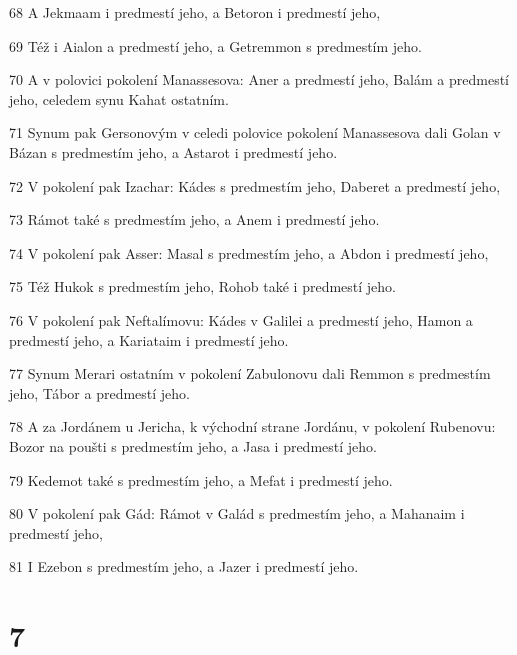 \par 68 A Jekmaam i predmestí jeho, a Betoron i predmestí jeho,
\par 69 Též i Aialon a predmestí jeho, a Getremmon s predmestím jeho.
\par 70 A v polovici pokolení Manassesova: Aner a predmestí jeho, Balám a predmestí jeho, celedem synu Kahat ostatním.
\par 71 Synum pak Gersonovým v celedi polovice pokolení Manassesova dali Golan v Bázan s predmestím jeho, a Astarot i predmestí jeho.
\par 72 V pokolení pak Izachar: Kádes s predmestím jeho, Daberet a predmestí jeho,
\par 73 Rámot také s predmestím jeho, a Anem i predmestí jeho.
\par 74 V pokolení pak Asser: Masal s predmestím jeho, a Abdon i predmestí jeho,
\par 75 Též Hukok s predmestím jeho, Rohob také i predmestí jeho.
\par 76 V pokolení pak Neftalímovu: Kádes v Galilei a predmestí jeho, Hamon a predmestí jeho, a Kariataim i predmestí jeho.
\par 77 Synum Merari ostatním v pokolení Zabulonovu dali Remmon s predmestím jeho, Tábor a predmestí jeho.
\par 78 A za Jordánem u Jericha, k východní strane Jordánu, v pokolení Rubenovu: Bozor na poušti s predmestím jeho, a Jasa i predmestí jeho.
\par 79 Kedemot také s predmestím jeho, a Mefat i predmestí jeho.
\par 80 V pokolení pak Gád: Rámot v Galád s predmestím jeho, a Mahanaim i predmestí jeho,
\par 81 I Ezebon s predmestím jeho, a Jazer i predmestí jeho.

\chapter{7}

